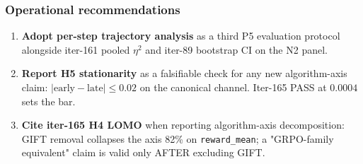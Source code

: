 \subsubsection{Operational recommendations}
\begin{enumerate}
\item \textbf{Adopt per-step trajectory analysis} as a third P5 evaluation protocol alongside iter-161 pooled $\eta^2$ and iter-89 bootstrap CI on the N2 panel.
\item \textbf{Report H5 stationarity} as a falsifiable check for any new algorithm-axis claim: $|\mathrm{early} - \mathrm{late}| \le 0.02$ on the canonical channel. Iter-165 PASS at $0.0004$ sets the bar.
\item \textbf{Cite iter-165 H4 LOMO} when reporting algorithm-axis decomposition: GIFT removal collapses the axis 82\% on \texttt{reward\_mean}; a "GRPO-family equivalent" claim is valid only AFTER excluding GIFT.
\end{enumerate}